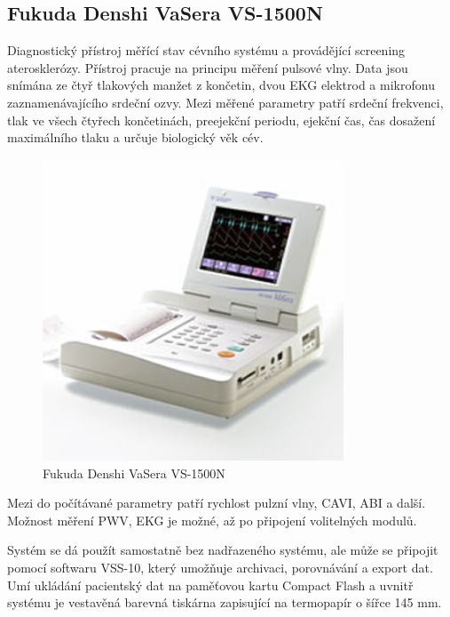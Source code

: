 \subsection{Fukuda Denshi VaSera VS-1500N}
Diagnostický přístroj měřící stav cévního systému a provádějící screening aterosklerózy. Přístroj pracuje na principu měření pulsové vlny. Data jsou snímána ze čtyř tlakových manžet z končetin, dvou EKG elektrod a mikrofonu zaznamenávajícího srdeční ozvy.
Mezi měřené parametry patří srdeční frekvenci, tlak ve všech čtyřech končetinách, preejekční periodu, ejekční čas, čas dosažení maximálního tlaku a určuje biologický věk cév.\cite{cite:Vasera}
\begin{figure}[H]
    \caption{Fukuda Denshi VaSera VS-1500N \cite{cite:Vasera}}
    \includegraphics[width=0.8\textwidth]{pictures/vs_1500n.jpg}
\end{figure}
Mezi do počítávané parametry patří rychlost pulzní vlny, CAVI, ABI a další. Možnost měření PWV, EKG je možné, až po připojení volitelných modulů.\cite{cite:Vasera}
\par
Systém se dá použít samostatně bez nadřazeného systému, ale může se připojit pomocí softwaru VSS-10, který umožňuje archivaci, porovnávání a export dat. Umí ukládání pacientský dat na paměťovou kartu Compact Flash a uvnitř systému je
vestavěná barevná tiskárna zapisující na termopapír o šířce 145 mm.\cite{cite:Vasera}
